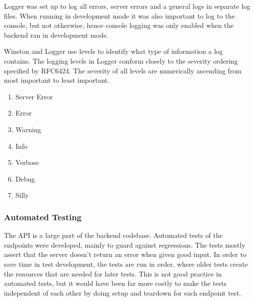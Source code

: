 Logger was set up to log all errors, server errors and a general logs in separate log files. When running in development mode it was also important to log to the console, but not otherwise, hence console logging was only enabled when the backend ran in development mode.

Winston and Logger use levels to identify what type of information a log contains. The logging levels in Logger conform closely to the severity ordering specified by RFC6424.
The severity of all levels are numerically ascending from most important to least important.

\begin{enumerate}
  \item Server Error
  \item Error
  \item Warning
  \item Info
  \item Verbose
  \item Debug
  \item Silly
\end{enumerate}

\subsubsection{Automated Testing}
The API is a large part of the backend codebase. Automated tests of the endpoints were developed, mainly to guard against regressions. The tests mostly assert that the server doesn't return an error when given good input. In order to save time in test development, the tests are run in order, where older tests create the resources that are needed for later tests. This is not good practice in automated tests, but it would have been far more costly to make the tests independent of each other by doing setup and teardown for each endpoint test.
